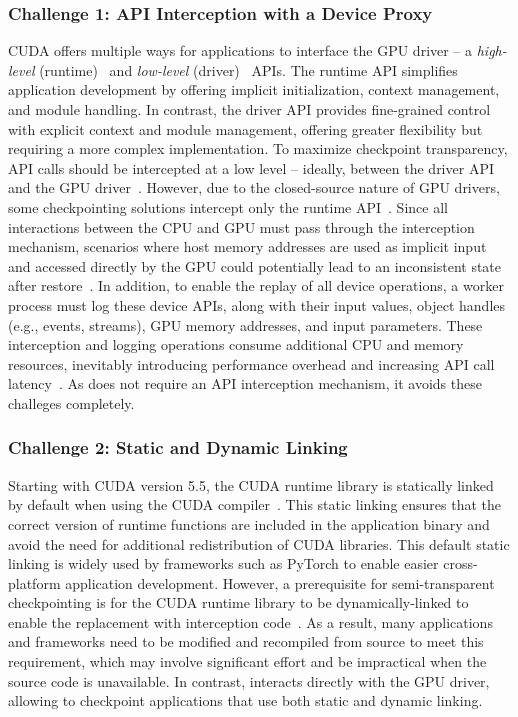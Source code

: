 \subsubsection*{Challenge 1: API Interception with a Device Proxy}%
CUDA offers multiple ways for applications to interface the GPU driver -- a \textit{high-level} (runtime)~\cite{nvidia2024runtime} and \textit{low-level} (driver)~\cite{nvidia2024driver} APIs. The runtime API simplifies application development by offering implicit initialization, context management, and module handling. In contrast, the driver API provides fine-grained control with explicit context and module management, offering greater flexibility but requiring a more complex implementation.
To maximize checkpoint transparency, API calls should be intercepted at a low level -- ideally, between the driver API and the GPU driver~\cite{shukla2022singularity}. However, due to the closed-source nature of GPU drivers, some checkpointing solutions intercept only the runtime API~\cite{eiling2022cricket}. Since all interactions between the CPU and GPU must pass through the interception mechanism, scenarios where host memory addresses are used as implicit input and accessed directly by the GPU could potentially lead to an inconsistent state after restore~\cite{gupta2024just}.
% 
In addition, to enable the replay of all device operations, a worker process must log these device APIs, along with their input values, object handles (e.g., events, streams), GPU memory addresses, and input parameters. These interception and logging operations consume additional CPU and memory resources, inevitably introducing performance overhead and increasing API call latency~\cite{eiling2022cricket}.
As \sys does not require an API interception mechanism, it avoids these challeges completely.

\subsubsection*{Challenge 2: Static and Dynamic Linking}%
Starting with CUDA version 5.5, the CUDA runtime library is statically linked by default when using the CUDA compiler~\cite{corporation2023cuda}. This static linking ensures that the correct version of runtime functions are included in the application binary and avoid the need for additional redistribution of CUDA libraries. This default static linking is widely used by frameworks such as PyTorch to enable easier cross-platform application development.
However, a prerequisite for semi-transparent checkpointing is for the CUDA runtime library to be dynamically-linked to enable the replacement with interception code~\cite{eiling2022cricket}.
As a result, many applications and frameworks need to be modified and recompiled from source to meet this requirement, which may involve significant effort and be impractical when the source code is unavailable. In contrast, \sys interacts directly with the GPU driver, allowing to checkpoint applications that use both static and dynamic linking.

